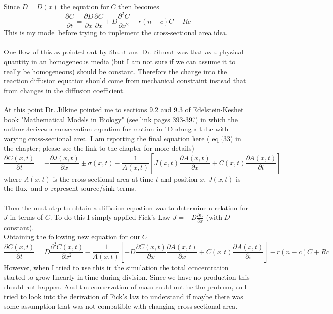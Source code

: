 \documentclass{amsart}
\theoremstyle{plain}
\numberwithin{equation}{section}
\begin{document}
Since $D=D(x)$ the equation for $C$ then becomes
\begin{equation}
\frac{\partial C}{\partial t}=\frac{\partial D}{\partial x}\frac{\partial C}{\partial x}+D\frac{\partial^2 C}{\partial x^2}- r(n-c)C+R c
\end{equation}
This is my model before trying to implement the cross-sectional area idea.\\\\
One flow of this as pointed out by Shant and Dr. Shrout was that as a physical quantity in an homogeneous media (but I am not sure if we can assume it to really be homogeneous) should be constant. Therefore the change into the reaction diffusion equation should come from mechanical constraint instead that from changes in the diffusion coefficient.\\\\
At this point Dr. Jilkine pointed me to sections 9.2 and 9.3 of Edelstein-Keshet book "Mathematical Models in Biology" (see link pages 393-397) in which the author derives a conservation equation for motion in 1D along a tube with varying cross-sectional area. I am reporting the final equation here ( eq (33) in the chapter; please see the link to the chapter for more details)
\begin{equation}
\frac{\partial C(x,t)}{\partial t}=-\frac{\partial J(x,t)}{\partial x}\pm\sigma(x,t)-\frac{1}{A(x,t)}\left[J(x,t)\frac{\partial A(x,t)}{\partial x}+C(x,t)\frac{\partial A(x,t)}{\partial t}\right]
\end{equation}
where $A(x,t)$ is the cross-sectional area at time $t$ and position $x$, $J(x,t)$ is the flux, and $\sigma$ represent source/sink terms.\\\\
Then the next step to obtain a diffusion equation was to determine a relation for $J$ in terms of $C$. To do this I simply applied Fick's Law $J = -D \frac{\partial C}{\partial x} $ (with $D$ constant).
\\
Obtaining the following new equation for our $C$
\begin{equation}
\frac{\partial C(x,t)}{\partial t}= D\frac{\partial^2 C(x,t)}{\partial x^2}-\frac{1}{A(x,t)}\left[-D\frac{\partial C(x,t)}{\partial x}\frac{\partial A(x,t)}{\partial x}+C(x,t)\frac{\partial A(x,t)}{\partial t}\right]- r(n-c)C+R c
\end{equation}
However, when I tried to use this in the simulation the total concentration started to grow linearly in time during division. Since we have no production this should not happen. And the conservation of mass could not be the problem, so I tried to look into the derivation of Fick's law to understand if maybe there was some assumption that was not compatible with changing cross-sectional area.\\
\end{document}
